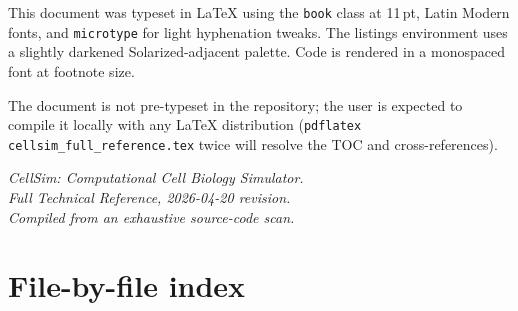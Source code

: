 \documentclass[11pt,letterpaper,twoside,openany]{book}
\begin{document}
This document was typeset in \LaTeX{} using the \texttt{book} class
at 11\,pt, Latin Modern fonts, and \texttt{microtype} for
light hyphenation tweaks. The listings environment uses a
slightly darkened Solarized-adjacent palette. Code is rendered in
a monospaced font at footnote size.

The document is not pre-typeset in the repository; the user is
expected to compile it locally with any \LaTeX{} distribution
(\texttt{pdflatex cellsim\_full\_reference.tex} twice will resolve
the TOC and cross-references).

\vspace{2em}
\begin{center}
\emph{CellSim: Computational Cell Biology Simulator.}\\
\emph{Full Technical Reference, 2026-04-20 revision.}\\[1em]
\emph{Compiled from an exhaustive source-code scan.}
\end{center}

\appendix

\chapter{File-by-file index}
\label{app:files}
\end{document}
